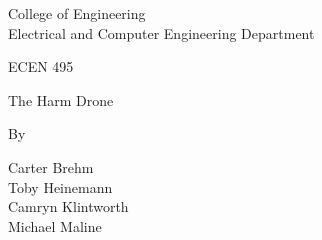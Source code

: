 \documentclass[12pt]{article}
\begin{document}
\begin{titlepage}
    \begin{center}
         \hfill
         \hfill
        
        {\Large College of Engineering\\
        Electrical and Computer Engineering Department\\}
        
        \vspace{2cm}
        {\Large ECEN 495}
        \vspace{0.5cm}
        
        {\Huge The Harm Drone}
        \vspace{2.5cm}
        
        {\large By\\}
        \begin{Large}
        Carter Brehm \\
        Toby Heinemann \\
        Camryn Klintworth \\
        Michael Maline\\
        \end{Large}
        
        \vspace{2cm}
        

\end{center}
\end{titlepage}
\end{document}
